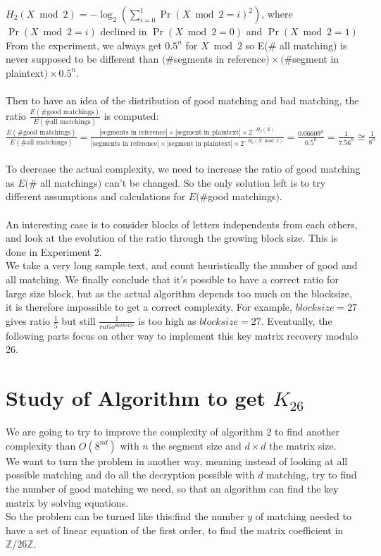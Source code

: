 \documentclass{article}
\begin{document}
$H_{2}(X \bmod 2) = -\log_2(\sum_{i=0}^{1}{\Pr(X \bmod 2 =i)^2})$, where $\Pr(X \bmod 2=i)$ declined in $\Pr(X \bmod 2=0)$ and $\Pr(X \bmod 2 =1)$\\
From the experiment, we always get $0.5^n$ for $X \bmod 2$ so E(\# all matching) is never supposed to be different than $(\# $segments in reference$) \times (\#$segment in plaintext$) \times 0.5^n$.\\
\\
Then to have an idea of the distribution of good matching and bad matching, the ratio $\frac{E(\# \text{good matchings})}{E(\# \text{all matchings})}$ is computed: $\frac{E(\# \text{good matchings})}{E(\# \text{all matchings})} = \frac{|\text{segments in reference}| \times |\text{segment in plaintext}| \times 2^{-H_{2}(X)}}{|\text{segments in reference}| \times |\text{segment in plaintext}| \times 2^{-H_{2}(X \bmod 2)}}  = \frac{0.06609^n}{0.5^n} = \frac{1}{7.56^n} \cong \frac{1}{8^n} $\\
\\
To decrease the actual complexity, we need to increase the ratio of good matching as $E(\#$ all matchings$)$ can't be changed. So the only solution left is to try different assumptions and calculations for $E(\# $good matchings$)$.\\
\\
An interesting case is to consider blocks of letters independents from each others, and look at the evolution of the ratio through the growing block size. This is done in Experiment 2.\\
We take a very long sample text, and count heuristically the number of good and all matching. 
We finally conclude that it's possible to have a correct ratio for large size block, but as the actual algorithm depends too much on the blocksize, it is therefore impossible to get a correct complexity. For example, $blocksize=27$ gives ratio $\frac{1}{5}$ but still $\frac{1}{ratio^{blocksize}}$ is too high as $blocksize = 27$.
Eventually, the following parts focus on other way to implement this key matrix recovery modulo 26.\\

\section{Study of Algorithm to get $K_{26}$}
We are going to try to improve the complexity of algorithm 2 to find another complexity than $O(8^{nd})$ with $n$ the segment size and $d \times d$ the matrix size.\\
We want to turn the problem in another way, meaning instead of looking at all possible matching and do all the decryption possible with $d$ matching, try to find  the number of good matching we need, so that an algorithm can find the key matrix by solving equations.\\
So the problem can be turned like this:find the number $y$ of matching needed to have a set of linear equation of the first order, to find the matrix coefficient in $\mathbb{Z}/26\mathbb{Z}$.\\
\end{document}
